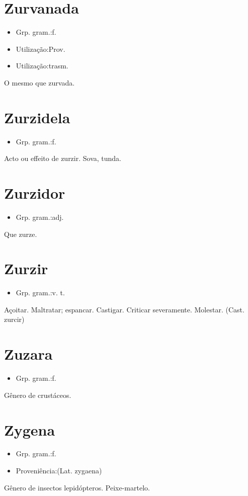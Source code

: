\section{Zurvanada}
\begin{itemize}
\item {Grp. gram.:f.}
\end{itemize}
\begin{itemize}
\item {Utilização:Prov.}
\end{itemize}
\begin{itemize}
\item {Utilização:trasm.}
\end{itemize}
O mesmo que \textunderscore zurvada\textunderscore .
\section{Zurzidela}
\begin{itemize}
\item {Grp. gram.:f.}
\end{itemize}
Acto ou effeito de zurzir.
Sova, tunda.
\section{Zurzidor}
\begin{itemize}
\item {Grp. gram.:adj.}
\end{itemize}
Que zurze.
\section{Zurzir}
\begin{itemize}
\item {Grp. gram.:v. t.}
\end{itemize}
Açoitar.
Maltratar; espancar.
Castigar.
Criticar severamente.
Molestar.
(Cast. \textunderscore zurcir\textunderscore )
\section{Zuzara}
\begin{itemize}
\item {Grp. gram.:f.}
\end{itemize}
Gênero de crustáceos.
\section{Zygena}
\begin{itemize}
\item {Grp. gram.:f.}
\end{itemize}
\begin{itemize}
\item {Proveniência:(Lat. \textunderscore zygaena\textunderscore )}
\end{itemize}
Gênero de insectos lepidópteros.
Peixe-martelo.
